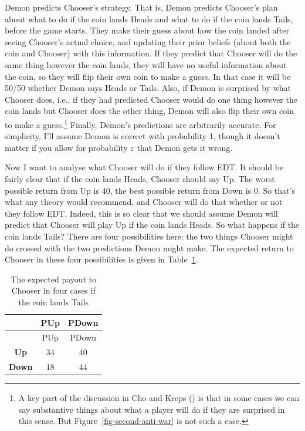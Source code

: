 \documentclass[
  12pt,
  letterpaper,
  DIV=11,
  numbers=noendperiod]{scrreprt}
\begin{document}
Demon predicts Chooser's strategy. That is, Demon predicts Chooser's
plan about what to do if the coin lands Heads and what to do if the coin
lands Tails, before the game starts. They make their guess about how the
coin landed after seeing Chooser's actual choice, and updating their
prior beliefs (about both the coin and Chooser) with this information.
If they predict that Chooser will do the same thing however the coin
lands, they will have no useful information about the coin, so they will
flip their own coin to make a guess. In that case it will be 50/50
whether Demon says Heads or Tails. Also, if Demon is surprised by what
Chooser does, i.e., if they had predicted Chooser would do one thing
however the coin lands but Chooser does the other thing, Demon will also
flip their own coin to make a guess.\footnote{A key part of the
  discussion in Cho and Kreps () is
  that in some cases we can say substantive things about what a player
  will do if they are surprised in this sense. But
  Figure~\ref{fig-second-anti-war} is not such a case.} Finally, Demon's
predictions are arbitrarily accurate. For simplicity, I'll assume Demon
is correct with probability 1, though it doesn't matter if you allow for
probability \(\varepsilon\) that Demon gets it wrong.

Now I want to analyse what Chooser will do if they follow EDT. It should
be fairly clear that if the coin lands Heads, Chooser should say Up. The
worst possible return from Up is 40, the best possible return from Down
is 0. So that's what any theory would recommend, and Chooser will do
that whether or not they follow EDT. Indeed, this is so clear that we
should assume Demon will predict that Chooser will play Up if the coin
lands Heads. So what happens if the coin lands Tails? There are four
possibilities here: the two things Chooser might do crossed with the two
predictions Demon might make. The expected return to Chooser in these
four possibilities is given in Table~\ref{tbl-payout-if-tails}.

\begin{longtable}[]{@{}ccc@{}}
\caption{The expected payout to Chooser in four cases if the coin lands
Tails}\label{tbl-payout-if-tails}\tabularnewline
\toprule\noalign{}
& PUp & PDown \\
\midrule\noalign{}
\endfirsthead
\toprule\noalign{}
& PUp & PDown \\
\midrule\noalign{}
\endhead
\bottomrule\noalign{}
\endlastfoot
\textbf{Up} & 34 & 40 \\
\textbf{Down} & 18 & 44 \\
\end{longtable}
\end{document}
